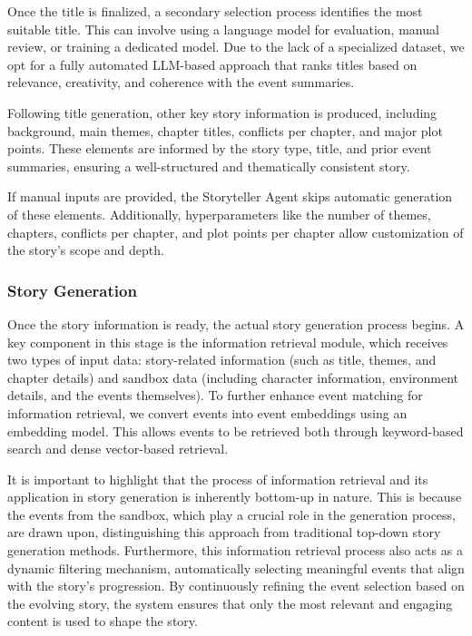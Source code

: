 \documentclass[letterpaper]{article} %
\begin{document}
Once the title is finalized, a secondary selection process identifies the most suitable title. This can involve using a language model for evaluation, manual review, or training a dedicated model. Due to the lack of a specialized dataset, we opt for a fully automated LLM-based approach that ranks titles based on relevance, creativity, and coherence with the event summaries.

Following title generation, other key story information is produced, including background, main themes, chapter titles, conflicts per chapter, and major plot points. These elements are informed by the story type, title, and prior event summaries, ensuring a well-structured and thematically consistent story.

If manual inputs are provided, the Storyteller Agent skips automatic generation of these elements. Additionally, hyperparameters like the number of themes, chapters, conflicts per chapter, and plot points per chapter allow customization of the story's scope and depth.

\subsubsection{Story Generation}

Once the story information is ready, the actual story generation process begins. A key component in this stage is the information retrieval module, which receives two types of input data: story-related information (such as title, themes, and chapter details) and sandbox data (including character information, environment details, and the events themselves). To further enhance event matching for information retrieval, we convert events into event embeddings using an embedding model. This allows events to be retrieved both through keyword-based search and dense vector-based retrieval.

It is important to highlight that the process of information retrieval and its application in story generation is inherently bottom-up in nature. This is because the events from the sandbox, which play a crucial role in the generation process, are drawn upon, distinguishing this approach from traditional top-down story generation methods. Furthermore, this information retrieval process also acts as a dynamic filtering mechanism, automatically selecting meaningful events that align with the story's progression. By continuously refining the event selection based on the evolving story, the system ensures that only the most relevant and engaging content is used to shape the story.
\end{document}

